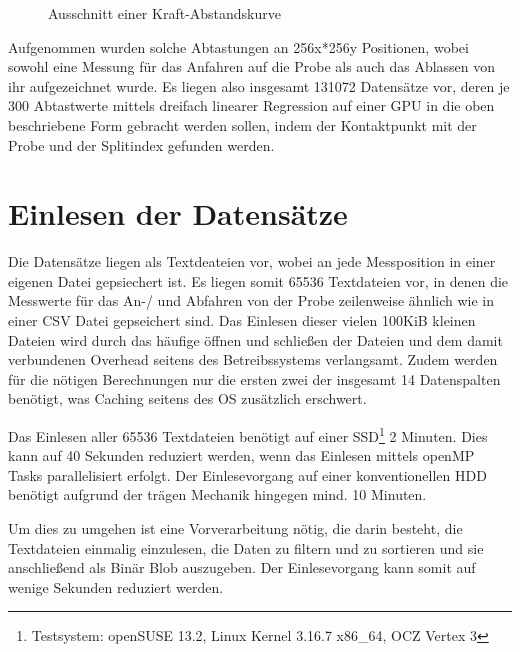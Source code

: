\begin{figure}[h!]
\centering
\caption{Ausschnitt einer Kraft-Abstandskurve}
\label{fig:kraftbsp}
\end{figure}

Aufgenommen wurden solche Abtastungen an 256x*256y Positionen, wobei sowohl eine Messung für das Anfahren auf die Probe als auch das Ablassen von ihr aufgezeichnet wurde. Es liegen also insgesamt 131072 Datensätze vor, deren je 300 Abtastwerte mittels dreifach linearer Regression auf einer GPU in die oben beschriebene Form gebracht werden sollen, indem der Kontaktpunkt mit der Probe und der Splitindex gefunden werden.


\section{Einlesen der Datensätze}
Die Datensätze liegen als Textdeateien vor, wobei an jede Messposition in einer eigenen Datei gepsiechert ist. Es liegen somit 65536 Textdateien vor, in denen die Messwerte für das An-/ und Abfahren von der Probe zeilenweise ähnlich wie in einer CSV Datei gepseichert sind.
Das Einlesen dieser vielen 100KiB kleinen Dateien wird durch das häufige öffnen und schließen der Dateien und dem damit verbundenen Overhead seitens des Betreibssystems verlangsamt. Zudem werden für die nötigen Berechnungen nur die ersten zwei der insgesamt 14 Datenspalten benötigt, was Caching seitens des OS zusätzlich erschwert.


Das Einlesen aller 65536 Textdateien benötigt auf einer SSD\footnote{Testsystem: openSUSE 13.2, Linux Kernel 3.16.7 x86\_64, OCZ Vertex 3} 2 Minuten. Dies kann auf 40 Sekunden reduziert werden, wenn das Einlesen mittels openMP Tasks parallelisiert erfolgt.
Der Einlesevorgang auf einer konventionellen HDD benötigt aufgrund der trägen Mechanik hingegen mind. 10 Minuten.

Um dies zu umgehen ist eine Vorverarbeitung nötig, die darin besteht, die Textdateien einmalig einzulesen, die Daten zu filtern und zu sortieren und sie anschließend als Binär Blob auszugeben. Der Einlesevorgang kann somit auf wenige Sekunden reduziert werden.

